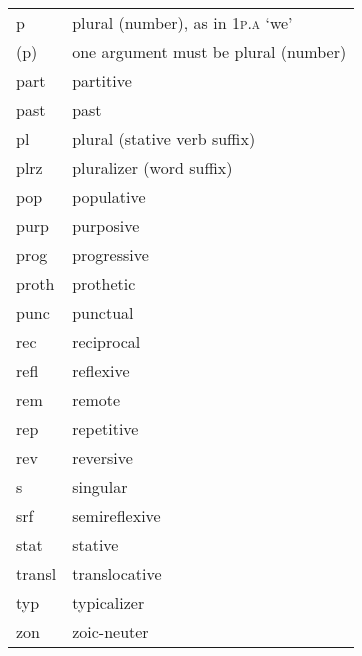 \begin{table}
\begin{tabularx}{\textwidth}{XX}
p   &   plural (number), as in \textsc{1p.a} ‘we’ \\
(p)	&	one argument must be plural (number) \\
part            &      partitive                             \\
past            &      past                                  \\
pl            &      plural (stative verb suffix)   \\
plrz            &      pluralizer (word suffix)   \\
pop             &      populative                            \\
purp	&	purposive \\
prog            &      progressive                           \\
proth           &      prothetic                             \\
punc            &      punctual                              \\
rec	&	reciprocal \\
refl            &      reflexive                             \\
rem             &      remote                                \\
rep             &      repetitive                            \\
rev             &      reversive                             \\
s	&	singular \\
srf             &      semireflexive                         \\
stat            &      stative                               \\
transl          &      translocative                         \\
typ & typicalizer \\
zon	&	zoic-neuter \\
\end{tabularx}
\end{table}